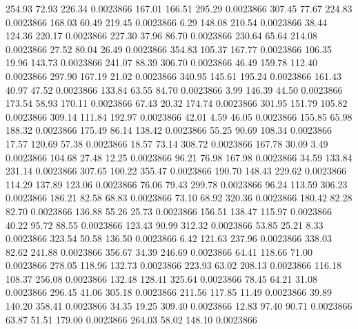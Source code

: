     254.93     72.93    226.34  0.0023866
    167.01    166.51    295.29  0.0023866
    307.45     77.67    224.83  0.0023866
    168.03     60.49    219.45  0.0023866
      6.29    148.08    210.54  0.0023866
     38.44    124.36    220.17  0.0023866
    227.30     37.96     86.70  0.0023866
    230.64     65.64    214.08  0.0023866
     27.52     80.04     26.49  0.0023866
    354.83    105.37    167.77  0.0023866
    106.35     19.96    143.73  0.0023866
    241.07     88.39    306.70  0.0023866
     46.49    159.78    112.40  0.0023866
    297.90    167.19     21.02  0.0023866
    340.95    145.61    195.24  0.0023866
    161.43     40.97     47.52  0.0023866
    133.84     63.55     84.70  0.0023866
      3.99    146.39     44.50  0.0023866
    173.54     58.93    170.11  0.0023866
     67.43     20.32    174.74  0.0023866
    301.95    151.79    105.82  0.0023866
    309.14    111.84    192.97  0.0023866
     42.01      4.59     46.05  0.0023866
    155.85     65.98    188.32  0.0023866
    175.49     86.14    138.42  0.0023866
     55.25     90.69    108.34  0.0023866
     17.57    120.69     57.38  0.0023866
     18.57     73.14    308.72  0.0023866
    167.78     30.09      3.49  0.0023866
    104.68     27.48     12.25  0.0023866
     96.21     76.98    167.98  0.0023866
     34.59    133.84    231.14  0.0023866
    307.65    100.22    355.47  0.0023866
    190.70    148.43    229.62  0.0023866
    114.29    137.89    123.06  0.0023866
     76.06     79.43    299.78  0.0023866
     96.24    113.59    306.23  0.0023866
    186.21     82.58     68.83  0.0023866
     73.10     68.92    320.36  0.0023866
    180.42     82.28     82.70  0.0023866
    136.88     55.26     25.73  0.0023866
    156.51    138.47    115.97  0.0023866
     40.22     95.72     88.55  0.0023866
    123.43     90.99    312.32  0.0023866
     53.85     25.21      8.33  0.0023866
    323.54     50.58    136.50  0.0023866
      6.42    121.63    237.96  0.0023866
    338.03     82.62    241.88  0.0023866
    356.67     34.39    246.69  0.0023866
     64.41    118.66     71.00  0.0023866
    278.05    118.96    132.73  0.0023866
    223.93     63.02    208.13  0.0023866
    116.18    108.37    256.08  0.0023866
    132.48    128.41    325.64  0.0023866
     78.45     64.21     31.08  0.0023866
    296.45     41.06    305.18  0.0023866
    211.56    117.85     11.49  0.0023866
     39.89    140.20    358.41  0.0023866
     34.35     19.25    309.40  0.0023866
     12.83     97.40     90.71  0.0023866
     63.87     51.51    179.00  0.0023866
    264.03     58.02    148.10  0.0023866
